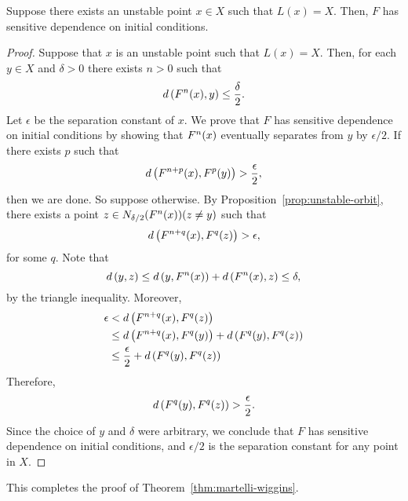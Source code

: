 \documentclass[10pt,draft,twoside]{book}
\begin{document}
\begin{proposition}
  Suppose there exists an unstable point $x \in X$ such that $L(x) = X$.
  Then, $F$ has sensitive dependence on initial conditions.
  \label{prop:martelli-wiggins2}
  \begin{proof}
    Suppose that $x$ is an unstable point such that $L(x) = X$.
    Then, for each $y\in X$ and $\delta > 0$ there exists $n>0$ such that 
    \begin{equation*}
      d\left( F^{n}(x), y \right) \leq \frac{\delta}{2}.
    \end{equation*}
    Let $\epsilon$ be the separation constant of $x$.
    We prove that $F$ has sensitive dependence on initial conditions by showing that $F^{n}(x)$ eventually separates from $y$ by $\epsilon/2$.
    If there exists $p$ such that 
    \begin{equation*}
      d\left( F^{n+p}(x), F^{p}(y) \right) > \frac{\epsilon}{2},
    \end{equation*}
    then we are done.
    So suppose otherwise.
    By Proposition~\ref{prop:unstable-orbit}, there exists a point $z \in N_{\delta/2}(F^{n}(x)) (z \neq y)$ such that 
    \begin{equation*}
      d\left( F^{n+q}(x), F^{q}(z) \right) > \epsilon,
    \end{equation*}
    for some $q$.
    Note that
    \begin{equation*}
      d\left( y, z \right) \leq d\left( y, F^{n}(x) \right) + d\left( F^{n}(x), z \right) \leq \delta,
    \end{equation*}
    by the triangle inequality.
    Moreover,
    \begin{align*}
      \epsilon &< d\left( F^{n+q}(x), F^{q}(z) \right) \\
      &\leq d\left( F^{n+q}(x), F^{q}(y) \right) + d\left( F^{q}(y), F^{q}(z) \right)  \\
      &\leq \frac{\epsilon}{2} + d\left( F^{q}(y), F^{q}(z) \right)
    \end{align*}
    Therefore,
    \begin{equation*}
      d\left( F^{q}(y), F^{q}(z) \right) > \frac{\epsilon}{2}.
    \end{equation*}
    Since the choice of $y$ and $\delta$ were arbitrary, we conclude that $F$ has sensitive dependence on initial conditions, and $\epsilon/2$ is the separation constant for any point in $X$.
  \end{proof}
\end{proposition}
This completes the proof of Theorem~\ref{thm:martelli-wiggins}.
\end{document}
